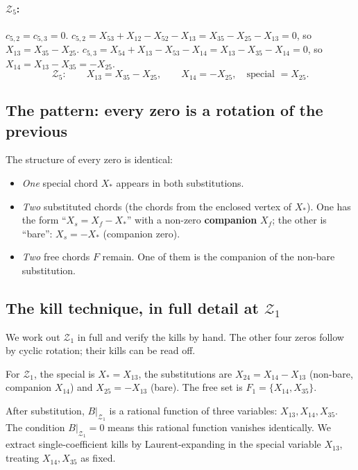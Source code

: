 \documentclass[11pt]{article}
\newcommand{\X}[2]{X_{#1#2}}
\newcommand{\Z}{\mathcal{Z}}
\theoremstyle{definition}
\begin{document}
\paragraph{$\Z_5$:} $c_{5,2}=c_{5,3}=0$.
$c_{5,2}=\X{5}{3}+\X{1}{2}-\X{5}{2}-\X{1}{3}=\X{3}{5}-\X{2}{5}-\X{1}{3}=0$, so $\X{1}{3}=\X{3}{5}-\X{2}{5}$.
$c_{5,3}=\X{5}{4}+\X{1}{3}-\X{5}{3}-\X{1}{4}=\X{1}{3}-\X{3}{5}-\X{1}{4}=0$, so $\X{1}{4}=\X{1}{3}-\X{3}{5}=-\X{2}{5}$.
\begin{equation}
\Z_5:\qquad\boxed{\X{1}{3}=\X{3}{5}-\X{2}{5},\qquad \X{1}{4}=-\X{2}{5}}, \quad\text{special }=\X{2}{5}.
\end{equation}

\subsection{The pattern: every zero is a rotation of the previous}

The structure of every zero is identical:
\begin{itemize}[nosep,leftmargin=2em]
\item \emph{One} special chord $X_*$ appears in both substitutions.
\item \emph{Two} substituted chords (the chords from the enclosed vertex of $X_*$).
  One has the form ``$X_s = X_f - X_*$'' with a non-zero \textbf{companion} $X_f$;
  the other is ``bare'': $X_s = -X_*$ (companion zero).
\item \emph{Two} free chords $F$ remain. One of them is the
  companion of the non-bare substitution.
\end{itemize}

\subsection{The kill technique, in full detail at \texorpdfstring{$\Z_1$}{Z1}}

We work out $\Z_1$ in full and verify the kills by hand. The other four
zeros follow by cyclic rotation; their kills can be read off.

For $\Z_1$, the special is $X_*=\X{1}{3}$, the substitutions are
$\X{2}{4}=\X{1}{4}-\X{1}{3}$ (non-bare, companion $\X{1}{4}$) and
$\X{2}{5}=-\X{1}{3}$ (bare). The free set is $F_1=\{\X{1}{4},\X{3}{5}\}$.

After substitution, $B|_{\Z_1}$ is a rational function of three variables:
$\X{1}{3},\X{1}{4},\X{3}{5}$. The condition $B|_{\Z_1}=0$ means this
rational function vanishes identically. We extract single-coefficient
kills by Laurent-expanding in the special variable $\X{1}{3}$, treating
$\X{1}{4},\X{3}{5}$ as fixed.
\end{document}
